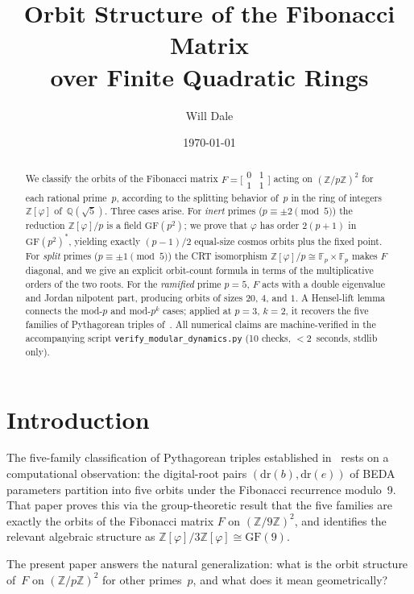 \documentclass[12pt]{article}
\title{Orbit Structure of the Fibonacci Matrix\\over Finite Quadratic Rings}
\author{Will Dale}
\date{\today}
\begin{document}
\maketitle

\begin{abstract}
We classify the orbits of the Fibonacci matrix
$F=\bigl[\begin{smallmatrix}0&1\\1&1\end{smallmatrix}\bigr]$
acting on $(\mathbb{Z}/p\mathbb{Z})^2$ for each rational prime~$p$, according to the
splitting behavior of~$p$ in the ring of integers $\mathbb{Z}[\varphi]$ of~$\mathbb{Q}(\sqrt{5})$.
Three cases arise.
For \emph{inert} primes ($p\equiv\pm2\pmod5$) the reduction $\mathbb{Z}[\varphi]/p$
is a field $\mathrm{GF}(p^2)$; we prove that $\varphi$ has order $2(p+1)$ in
$\mathrm{GF}(p^2)^*$, yielding exactly $(p-1)/2$ equal-size cosmos orbits plus
the fixed point.
For \emph{split} primes ($p\equiv\pm1\pmod5$) the CRT isomorphism
$\mathbb{Z}[\varphi]/p\cong\mathbb{F}_p\times\mathbb{F}_p$ makes $F$ diagonal, and we
give an explicit orbit-count formula in terms of the multiplicative orders of the two roots.
For the \emph{ramified} prime $p=5$, $F$ acts with a double eigenvalue and Jordan
nilpotent part, producing orbits of sizes $20$, $4$, and $1$.
A Hensel-lift lemma connects the mod-$p$ and mod-$p^k$ cases; applied at $p=3$, $k=2$,
it recovers the five families of Pythagorean triples of~\cite{pyth-families}.
All numerical claims are machine-verified in the accompanying script
\texttt{verify\_modular\_dynamics.py} (10 checks, $<2$~seconds, stdlib only).
\end{abstract}

\section{Introduction}

The five-family classification of Pythagorean triples established in~\cite{pyth-families}
rests on a computational observation: the digital-root pairs $(\mathrm{dr}(b),\mathrm{dr}(e))$
of BEDA parameters partition into five orbits under the Fibonacci recurrence modulo~9.
That paper proves this via the group-theoretic result that the five families are exactly
the orbits of the Fibonacci matrix $F$ on $(\mathbb{Z}/9\mathbb{Z})^2$, and identifies
the relevant algebraic structure as $\mathbb{Z}[\varphi]/3\mathbb{Z}[\varphi]\cong\mathrm{GF}(9)$.

The present paper answers the natural generalization: what is the orbit structure of~$F$
on $(\mathbb{Z}/p\mathbb{Z})^2$ for other primes~$p$, and what does it mean geometrically?
\end{document}

